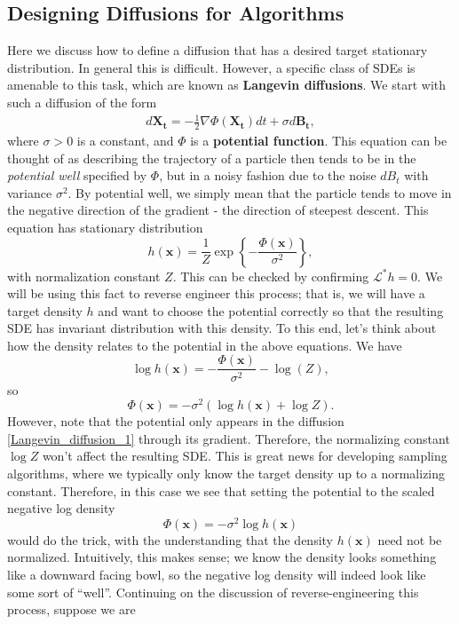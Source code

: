 \documentclass[12pt]{article}
\newcommand{\B}[1]{\boldsymbol{#1}}
\newcommand{\bx}{\mathbf{x}}
\newcommand{\state}[1][t]{X_{#1}}
\newcommand{\BM}[1][t]{B_{#1}} %
\newcommand{\gen}{\mathcal{L}} %
\newcommand{\invariantDens}{h} %
\newcommand{\potential}{\Phi} %
\begin{document}
\subsection{Designing Diffusions for Algorithms}
Here we discuss how to define a diffusion that has a desired target stationary distribution. In general this is difficult. However, a specific class of SDEs is amenable to 
this task, which are known as \textbf{Langevin diffusions}. We start with such a diffusion of the form 
\begin{align}
d\B\state = -\frac{1}{2} \nabla \potential(\B\state) dt + \sigma d\B\BM \label{Langevin_diffusion_1},
\end{align}
where $\sigma > 0$ is a constant, and $\potential$ is a \textbf{potential function}. This equation can be thought of as describing the trajectory of a particle then tends 
to be in the \textit{potential well} specified by $\potential$, but in a noisy fashion due to the noise $d\BM$ with variance $\sigma^2$. 
By potential well, we simply mean that the particle tends to move in the negative direction of the gradient - the direction of steepest descent. This equation has 
stationary distribution 
\[
\invariantDens(\bx) = \frac{1}{Z} \exp\left\{-\frac{\potential(\bx)}{\sigma^2} \right\},
\]
with normalization constant $Z$. This can be checked by confirming $\gen^* \invariantDens = 0$. We will be using this fact to reverse engineer this process; that is, we 
will have a target density $\invariantDens$ and want to choose the potential correctly so that the resulting SDE has invariant distribution with this density. To this end, let's 
think about how the density relates to the potential in the above equations. We have 
\[
\log \invariantDens(\bx) = -\frac{\potential(\bx)}{\sigma^2}  - \log(Z), 
\]
so 
\[
\potential(\bx) = -\sigma^2\left(\log \invariantDens(\bx) + \log Z \right).
\]
However, note that the potential only appears in the diffusion \ref{Langevin_diffusion_1} through its gradient. Therefore, the normalizing constant $\log Z$ won't affect the 
resulting SDE. This is great news for developing sampling algorithms, where we typically only know the target density up to a normalizing constant. Therefore, in this case 
we see that setting the potential to the scaled negative log density 
\[
\potential(\bx) = -\sigma^2 \log \invariantDens(\bx)
\]
would do the trick, with the understanding that the density $\invariantDens(\bx)$ need not be normalized. Intuitively, this makes sense; we know the density looks something like 
a downward facing bowl, so the negative log density will indeed look like some sort of ``well''. Continuing on the discussion of reverse-engineering this process, suppose we are 
\end{document}
